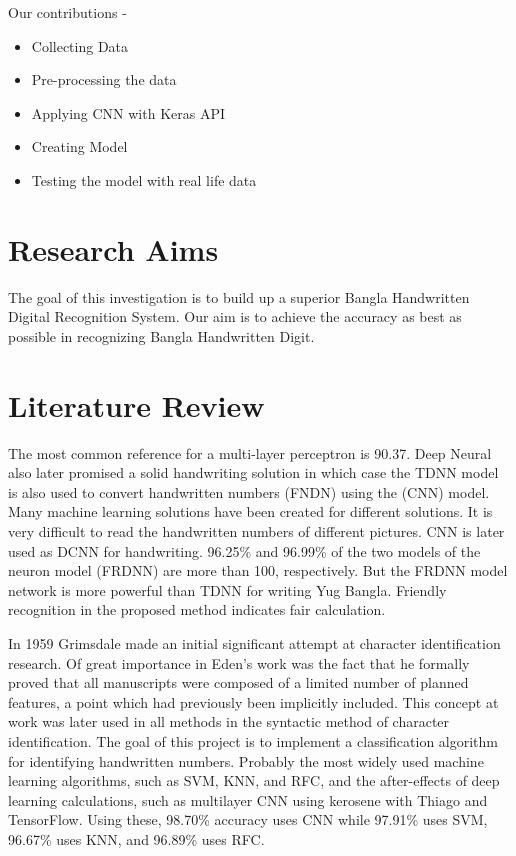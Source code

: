 \documentclass[conference]{IEEEtran}
\begin{document}
Our contributions - 
\begin{itemize}

\item Collecting Data
\item Pre-processing the data
\item Applying CNN with Keras API 
\item Creating Model
\item Testing the model with real life data

\end{itemize}

\section{Research Aims}
The goal of this investigation is to build up a superior Bangla Handwritten Digital Recognition System. Our aim is to achieve the accuracy as best as possible in recognizing Bangla Handwritten Digit.


\section{Literature Review}

The most common reference for a multi-layer perceptron is 90.37. Deep Neural also later promised a solid handwriting solution in which case the TDNN model is also used to convert handwritten numbers (FNDN) using the (CNN) model. Many machine learning solutions have been created for different solutions. It is very difficult to read the handwritten numbers of different pictures. CNN is later used as DCNN for handwriting. 96.25\% and 96.99\% of the two models of the neuron model (FRDNN) are more than 100, respectively. But the FRDNN model network is more powerful than TDNN for writing Yug Bangla. Friendly recognition in the proposed method indicates fair calculation. \cite{Hossain2021-ns} 

In 1959 Grimsdale made an initial significant attempt at character identification research. Of great importance in Eden's work was the fact that he formally proved that all manuscripts were composed of a limited number of planned features, a point which had previously been implicitly included. This concept at work was later used in all methods in the syntactic method of character identification. The goal of this project is to implement a classification algorithm for identifying handwritten numbers. Probably the most widely used machine learning algorithms, such as SVM, KNN, and RFC, and the after-effects of deep learning calculations, such as multilayer CNN using kerosene with Thiago and TensorFlow. Using these, 98.70\% accuracy uses CNN while 97.91\% uses SVM, 96.67\% uses KNN, and 96.89\% uses RFC. \cite{Siddique2019-ku} 
\end{document}
